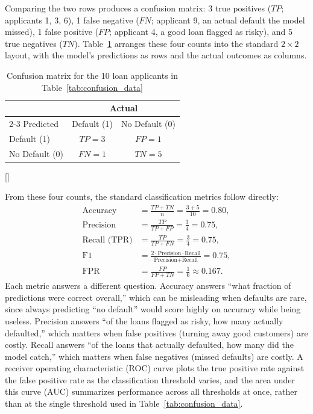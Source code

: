 \documentclass[../ai_in_finance]{subfiles}
\begin{document}
Comparing the two rows produces a confusion matrix: 3 true positives ($TP$; applicants 1, 3, 6), 1 false negative ($FN$; applicant 9, an actual default the model missed), 1 false positive ($FP$; applicant 4, a good loan flagged as risky), and 5 true negatives ($TN$). Table~\ref{tab:confusion_matrix} arranges these four counts into the standard $2\times 2$ layout, with the model's predictions as rows and the actual outcomes as columns.

\begin{table}[htbp]
\centering
\begin{lrbox}{\bookmeasuredbox}
\begin{tabular}{lcc}
\toprule
 & \multicolumn{2}{c}{Actual} \\
\cmidrule(l){2-3}
Predicted & Default (1) & No Default (0) \\
\midrule
Default (1) & $TP=3$ & $FP=1$ \\
No Default (0) & $FN=1$ & $TN=5$ \\
\bottomrule
\end{tabular}
\end{lrbox}
\ifdim\wd\bookmeasuredbox<0.65\linewidth
\setlength{\bookcapwidth}{0.65\linewidth}
\else
\setlength{\bookcapwidth}{\wd\bookmeasuredbox}
\fi
{}[\bookcapwidth]{
\usebox{\bookmeasuredbox}
}{
\caption{Confusion matrix for the 10 loan applicants in Table~\ref{tab:confusion_data}}
\label{tab:confusion_matrix}
}
\end{table}

From these four counts, the standard classification metrics follow directly:
\begin{align*}
\text{Accuracy} &= \frac{TP+TN}{n} = \frac{3+5}{10} = 0.80, \\
\text{Precision} &= \frac{TP}{TP+FP} = \frac{3}{4} = 0.75, \\
\text{Recall (TPR)} &= \frac{TP}{TP+FN} = \frac{3}{4} = 0.75, \\
\text{F1} &= \frac{2 \cdot \text{Precision} \cdot \text{Recall}}{\text{Precision}+\text{Recall}} = 0.75, \\
\text{FPR} &= \frac{FP}{FP+TN} = \frac{1}{6} \approx 0.167.
\end{align*}
Each metric answers a different question. Accuracy answers ``what fraction of predictions were correct overall,'' which can be misleading when defaults are rare, since always predicting ``no default'' would score highly on accuracy while being useless. Precision answers ``of the loans flagged as risky, how many actually defaulted,'' which matters when false positives (turning away good customers) are costly. Recall answers ``of the loans that actually defaulted, how many did the model catch,'' which matters when false negatives (missed defaults) are costly. A receiver operating characteristic (ROC) curve plots the true positive rate against the false positive rate as the classification threshold varies, and the area under this curve (AUC) summarizes performance across all thresholds at once, rather than at the single threshold used in Table~\ref{tab:confusion_data}.
\end{document}
